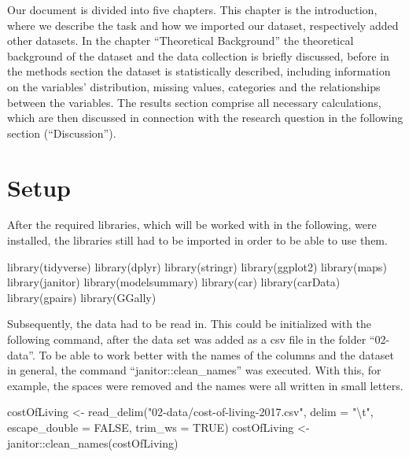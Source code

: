 \documentclass[
  11pt,
  a4paper,
  twoside]{scrbook}
\newenvironment{Shaded}{\begin{snugshade}}{\end{snugshade}}
\newcommand{\AttributeTok}[1]{\textcolor[rgb]{0.77,0.63,0.00}{#1}}
\newcommand{\ConstantTok}[1]{\textcolor[rgb]{0.00,0.00,0.00}{#1}}
\newcommand{\FunctionTok}[1]{\textcolor[rgb]{0.00,0.00,0.00}{#1}}
\newcommand{\NormalTok}[1]{#1}
\newcommand{\OtherTok}[1]{\textcolor[rgb]{0.56,0.35,0.01}{#1}}
\newcommand{\SpecialCharTok}[1]{\textcolor[rgb]{0.00,0.00,0.00}{#1}}
\newcommand{\StringTok}[1]{\textcolor[rgb]{0.31,0.60,0.02}{#1}}
\begin{document}
Our document is divided into five chapters. This chapter is the introduction, where we describe the task and how we imported our dataset, respectively added other datasets.
In the chapter ``Theoretical Background'' the theoretical background of the dataset and the data collection is briefly discussed, before in the methods section the dataset is statistically described, including information on the variables' distribution, missing values,
categories and the relationships between the variables.
The results section comprise all necessary calculations, which are then discussed in connection with the research question in the following section (``Discussion'').

\hypertarget{setup}{%
\section{Setup}\label{setup}}

After the required libraries, which will be worked with in the following, were installed, the libraries still had to be imported in order to be able to use them.

\linespread{1}

\begin{Shaded}
\begin{Highlighting}[]
\FunctionTok{library}\NormalTok{(tidyverse)}
\FunctionTok{library}\NormalTok{(dplyr)}
\FunctionTok{library}\NormalTok{(stringr)}
\FunctionTok{library}\NormalTok{(ggplot2)}
\FunctionTok{library}\NormalTok{(maps)}
\FunctionTok{library}\NormalTok{(janitor)}
\FunctionTok{library}\NormalTok{(modelsummary)}
\FunctionTok{library}\NormalTok{(car)}
\FunctionTok{library}\NormalTok{(carData)}
\FunctionTok{library}\NormalTok{(gpairs)}
\FunctionTok{library}\NormalTok{(GGally)}
\end{Highlighting}
\end{Shaded}

\linespread{1}

Subsequently, the data had to be read in. This could be initialized with the following command, after the data set was added as a csv file in the folder ``02-data''.
To be able to work better with the names of the columns and the dataset in general, the command ``janitor::clean\_names'' was executed. With this, for example, the spaces were removed and the names were all written in small letters.

\linespread{1}

\begin{Shaded}
\begin{Highlighting}[]
\NormalTok{costOfLiving }\OtherTok{\textless{}{-}} \FunctionTok{read\_delim}\NormalTok{(}\StringTok{"02{-}data/cost{-}of{-}living{-}2017.csv"}\NormalTok{, }
                      \AttributeTok{delim =} \StringTok{"}\SpecialCharTok{\textbackslash{}t}\StringTok{"}\NormalTok{, }\AttributeTok{escape\_double =} \ConstantTok{FALSE}\NormalTok{, }
                      \AttributeTok{trim\_ws =} \ConstantTok{TRUE}\NormalTok{)}
\NormalTok{costOfLiving }\OtherTok{\textless{}{-}}\NormalTok{ janitor}\SpecialCharTok{::}\FunctionTok{clean\_names}\NormalTok{(costOfLiving)}
\end{Highlighting}
\end{Shaded}
\end{document}
